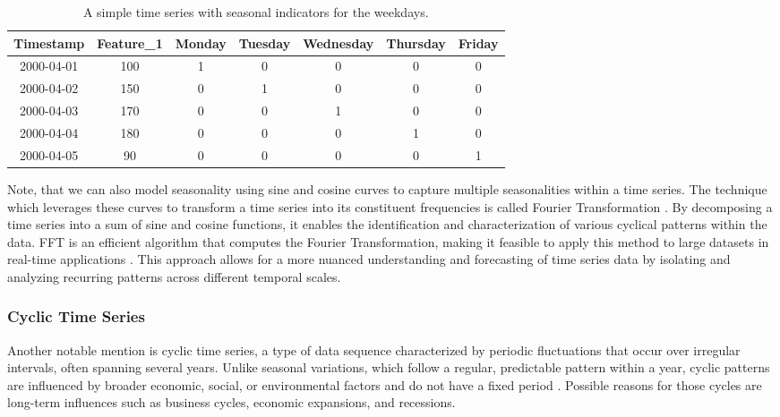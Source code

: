 \begin{table}[h]
    \centering
    \begin{tabular}{|c|c|c|c|c|c|c|}
        \hline
        \textbf{Timestamp} & \textbf{Feature\_1} & \textbf{Monday} & \textbf{Tuesday} & \textbf{Wednesday} & \textbf{Thursday} & \textbf{Friday} \\
        \hline
        2000-04-01         & 100                 & 1               & 0                & 0                  & 0                 & 0               \\
        \hline
        2000-04-02         & 150                 & 0               & 1                & 0                  & 0                 & 0               \\
        \hline
        2000-04-03         & 170                 & 0               & 0                & 1                  & 0                 & 0               \\
        \hline
        2000-04-04         & 180                 & 0               & 0                & 0                  & 1                 & 0               \\
        \hline
        2000-04-05         & 90                  & 0               & 0                & 0                  & 0                 & 1               \\
        \hline
    \end{tabular}
    \caption{A simple time series with seasonal indicators for the weekdays.}
    \label{tab:time_series_simple}
\end{table}

Note, that we can also model seasonality using sine and cosine curves to capture
multiple seasonalities within a time series. The technique which leverages these
curves to transform a time series into its constituent frequencies is called
Fourier Transformation \parencite[ch. 1]{bloomfield2004fourier}. By decomposing
a time series into a sum of sine and cosine functions, it enables the identification
and characterization of various cyclical patterns within the data. \ac{FFT} is
an efficient algorithm that computes the Fourier Transformation, making
it feasible to apply this method to large datasets in real-time applications
\parencite[ch. 5]{bloomfield2004fourier}. This approach allows for a more nuanced
understanding and forecasting of time series data by isolating and analyzing
recurring patterns across different temporal scales.

\subsubsection*{Cyclic Time Series}
Another notable mention is cyclic time series, a type of data sequence characterized
by periodic fluctuations that occur over irregular intervals, often spanning several
years. Unlike seasonal variations, which follow a regular, predictable pattern within
a year, cyclic patterns are influenced by broader economic, social, or environmental
factors and do not have a fixed period \parencite[p.4102]{gharehbaghi2017deep}.
Possible reasons for those cycles are long-term influences such as business cycles,
economic expansions, and recessions.


